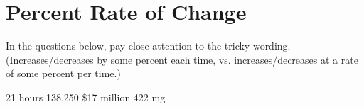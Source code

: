\section*{Percent Rate of Change}
In the questions below, pay close attention to the tricky wording. (Increases/decreases by some percent each time, vs. increases/decreases at a rate of some percent per time.)
\begin{smenum}
\mitemxxxx
{21 hours}
{138,250}
{\$17 million}
{422 mg}
\end{smenum}
